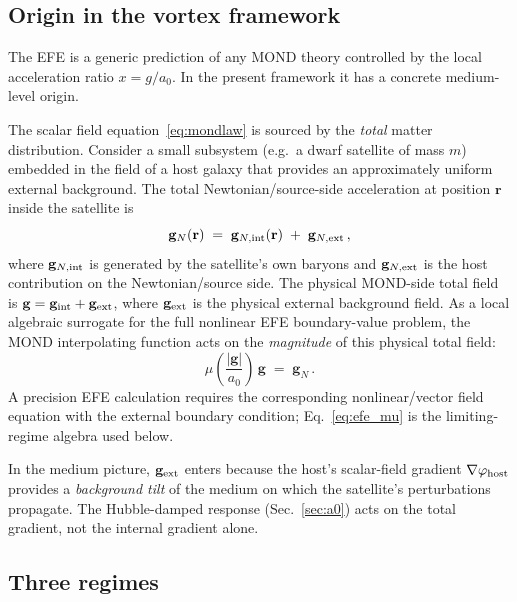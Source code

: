\documentclass[11pt]{article}
\begin{document}
\subsection{Origin in the vortex framework}

The EFE is a generic prediction of any MOND theory controlled by
the local acceleration ratio $x = g/a_0$.  In the present framework
it has a concrete medium-level origin.

The scalar field equation~\eqref{eq:mondlaw} is sourced by the
\emph{total} matter distribution.  Consider a small subsystem
(e.g.\ a dwarf satellite of mass $m$) embedded in the field of a
host galaxy that provides an approximately uniform external
background.  The total Newtonian/source-side acceleration at
position $\mathbf{r}$ inside the satellite is
\begin{equation}
  \mathbf{g}_N(\mathbf{r})
  \;=\;
  \mathbf{g}_{N,{\rm int}}(\mathbf{r})
  \;+\;
  \mathbf{g}_{N,{\rm ext}}\,,
\label{eq:g_total_efe}
\end{equation}
where $\mathbf{g}_{N,{\rm int}}$ is generated by the satellite's
own baryons and $\mathbf{g}_{N,{\rm ext}}$ is the host contribution
on the Newtonian/source side.  The physical MOND-side total field is
$\mathbf{g}=\mathbf{g}_{\rm int}+\mathbf{g}_{\rm ext}$, where
$\mathbf{g}_{\rm ext}$ is the physical external background field.
As a local algebraic surrogate for the full nonlinear EFE
boundary-value problem, the MOND interpolating function acts on the
\emph{magnitude} of this physical total field:
\begin{equation}
  \mu\!\left(\frac{|\mathbf{g}|}{a_0}\right)\,\mathbf{g}
  \;=\;
  \mathbf{g}_N\,.
\label{eq:efe_mu}
\end{equation}
A precision EFE calculation requires the corresponding
nonlinear/vector field equation with the external boundary condition;
Eq.~\eqref{eq:efe_mu} is the limiting-regime algebra used below.

In the medium picture, $\mathbf{g}_{\rm ext}$ enters because the
host's scalar-field gradient $\nabla\varphi_{\rm host}$ provides a
\emph{background tilt} of the medium on which the satellite's
perturbations propagate.  The Hubble-damped response
(Sec.~\ref{sec:a0}) acts on the total gradient, not the
internal gradient alone.

\subsection{Three regimes}
\end{document}
